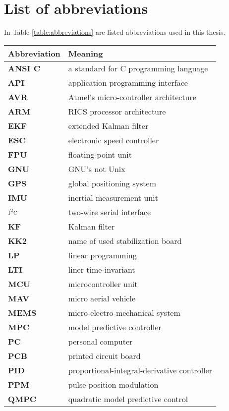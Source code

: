 \section{List of abbreviations}\label{ape:abbreviations}

In Table \ref{table:abbreviations} are listed abbreviations used in this thesis.

\begin{table}[!htb]
\centering
\begin{tabular}{ll}
\hline
\textbf{Abbreviation} & \textbf{Meaning} \\
\hline
\textbf{ANSI C} & a standard for C programming language \\
\textbf{API} & application programming interface \\
\textbf{AVR} & Atmel's micro-controller architecture \\
\textbf{ARM} & RICS processor architecture \\
\textbf{EKF} & extended Kalman filter \\ 
\textbf{ESC} & electronic speed controller \\
\textbf{FPU} & floating-point unit \\
\textbf{GNU} & GNU's not Unix \\
\textbf{GPS} & global positioning system \\
\textbf{IMU} & inertial measurement unit \\
\textbf{$\textsc{i}^2\textsc{c}$} & two-wire serial interface\\
\textbf{KF} & Kalman filter \\
\textbf{KK2} & name of used stabilization board\\
\textbf{LP} & linear programming \\
\textbf{LTI} & liner time-invariant \\
\textbf{MCU} & microcontroller unit \\
\textbf{MAV} & micro aerial vehicle \\
\textbf{MEMS} & micro-electro-mechanical system \\
\textbf{MPC} & model predictive controller \\
\textbf{PC} & personal computer \\
\textbf{PCB} & printed circuit board \\
\textbf{PID} & proportional-integral-derivative controller \\
\textbf{PPM} & pulse-position modulation \\
\textbf{QMPC} & quadratic model predictive control\\

\end{tabular}
\end{table}
